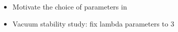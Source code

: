 \begin{itemize}
    \item Motivate the choice of parameters in~\cite{Bauer:2017ota}
    \item Vacuum stability study: fix lambda parameters to 3
\end{itemize}